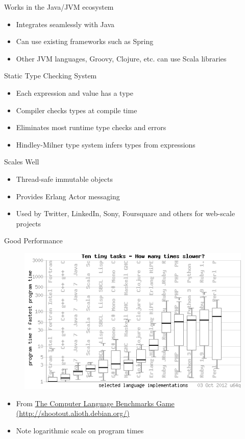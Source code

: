 \documentclass[t]{beamer}
\begin{document}
\begin{frame}{Works in the Java/JVM ecosystem}
  \begin{itemize}
  \item Integrates seamlessly with Java
  \item Can use existing frameworks such as Spring
  \item Other JVM languages, Groovy, Clojure, etc. can use Scala libraries
  \end{itemize}
\note{}
 \end{frame}

\begin{frame}{Static Type Checking System}
  \begin{itemize}
  \item Each expression and value has a type
  \item Compiler checks types at compile time
  \item Eliminates most runtime type checks and errors
  \item Hindley-Milner type system infers types from expressions
  \end{itemize}
  \note{}
\end{frame}

\begin{frame}{Scales Well}
  \begin{itemize}
  \item Thread-safe immutable objects
  \item Provides Erlang Actor messaging
  \item Used by Twitter, LinkedIn, Sony, Foursquare and others for web-scale projects
  \end{itemize}
  \note{}
\end{frame}

\begin{frame}{Good Performance}
  \begin{figure}
    \includegraphics[scale=0.50]{CLshootout.png}
  \end{figure}
  \begin{itemize}
  \item From \href{http://shootout.alioth.debian.org/}{The Computer 
    Language Benchmarks Game (http://shootout.alioth.debian.org/)}
  \item Note logarithmic scale on program times
  \end{itemize}
\end{frame}
\end{document}
